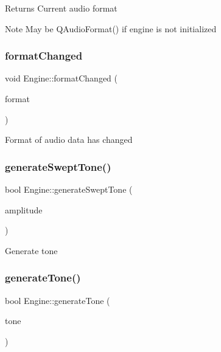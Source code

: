 \begin{DoxyReturn}{Returns}
Current audio format 
\end{DoxyReturn}
\begin{DoxyNote}{Note}
May be Q\+Audio\+Format() if engine is not initialized 
\end{DoxyNote}
\hypertarget{class_engine_a08be5a3820381f266b3bf2b3a3b91549}{}\label{class_engine_a08be5a3820381f266b3bf2b3a3b91549} 
\subsubsection{\texorpdfstring{format\+Changed}{formatChanged}}
{\footnotesize\ttfamily void Engine\+::format\+Changed (\begin{DoxyParamCaption}\item[{const Q\+Audio\+Format \&}]{format }\end{DoxyParamCaption})\hspace{0.3cm}{\ttfamily [signal]}}

Format of audio data has changed \hypertarget{class_engine_a0fa43cb25d35f9da09b58612a8af9e77}{}\label{class_engine_a0fa43cb25d35f9da09b58612a8af9e77} 
\subsubsection{\texorpdfstring{generate\+Swept\+Tone()}{generateSweptTone()}}
{\footnotesize\ttfamily bool Engine\+::generate\+Swept\+Tone (\begin{DoxyParamCaption}\item[{qreal}]{amplitude }\end{DoxyParamCaption})}

Generate tone \hypertarget{class_engine_aaaa5e9ce9bf266dac28460e2adaa1270}{}\label{class_engine_aaaa5e9ce9bf266dac28460e2adaa1270} 
\subsubsection{\texorpdfstring{generate\+Tone()}{generateTone()}}
{\footnotesize\ttfamily bool Engine\+::generate\+Tone (\begin{DoxyParamCaption}\item[{const \hyperlink{struct_tone}{Tone} \&}]{tone }\end{DoxyParamCaption})}

